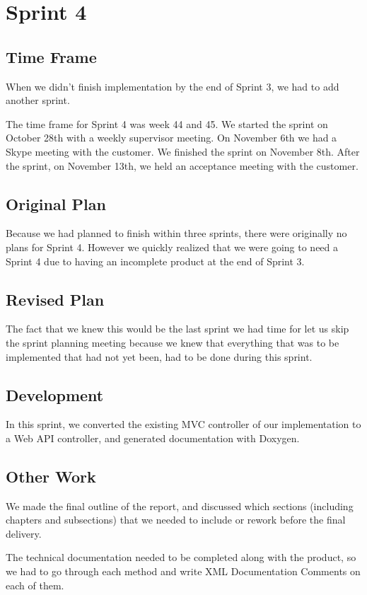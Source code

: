 \section{Sprint 4}

\subsection{Time Frame}
When we didn't finish implementation by the end of Sprint 3, we had to add another sprint.

The time frame for Sprint 4 was week 44 and 45. We started the sprint on October 28th with a weekly supervisor meeting. On November 6th we had a Skype meeting with the customer. We finished the sprint on November 8th. After the sprint, on November 13th, we held an acceptance meeting with the customer.

\subsection{Original Plan}
Because we had planned to finish within three sprints, there were originally no plans for Sprint 4. However we quickly realized that we were going to need a Sprint 4 due to having an incomplete product at the end of Sprint 3.

\subsection{Revised Plan}
The fact that we knew this would be the last sprint we had time for let us skip the sprint planning meeting because we knew that everything that was to be implemented that had not yet been, had to be done during this sprint.

\subsection{Development}
In this sprint, we converted the existing MVC controller of our implementation to a Web API controller, and generated documentation with Doxygen.

\subsection{Other Work}
We made the final outline of the report, and discussed which sections (including chapters and subsections) that we needed to include or rework before the final delivery.

The technical documentation needed to be completed along with the product, so we had to go through each method and write XML Documentation Comments on each of them.

